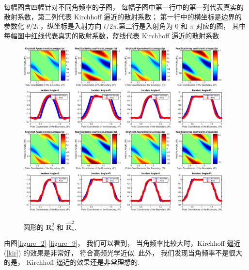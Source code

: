 { 每幅图含四幅针对不同角频率的子图， 每幅子图中第一行中的第一列代表真实的散射系数，第二列代表 Kirchhoff 逼近的散射系数； 第一行中的横坐标是边界的参数化 $\theta/2\pi$，纵坐标是入射方向 $t/2\pi$.第二行是入射角为 $0$ 和 $\pi$ 对应的图， 其中每幅图中红线代表真实的散射系数，蓝线代表 Kirchhoff 逼近的散射系数.
\begin{figure}[htbp]
	\centering
	\includegraphics[width=0.48\textwidth]{./Img/figure_sc_elastic/sc_s2_circle_1.eps}
	\includegraphics[width=0.48\textwidth]{./Img/figure_sc_elastic/sc_s2_circle_2.eps}
	\includegraphics[width=0.48\textwidth]{./Img/figure_sc_elastic/sc_s2_circle_4.eps}
	\includegraphics[width=0.48\textwidth]{./Img/figure_sc_elastic/sc_s2_circle_8.eps}		
	\caption{圆形的 $\mathbf{R}_s^2$ 和 $\hat {\mathbf{R}}_s^2$. }\label{figure_5}
\end{figure}
由图\ref{figure_2}-\ref{figure_9}， 我们可以看到， 当角频率比较大时，Kirchhoff 逼近 (\ref{kir}) 的效果是非常好， 符合高频光学近似. 此外， 我们发现当角频率不是很大的是， Kirchhoff 逼近的效果还是非常理想的.

}
